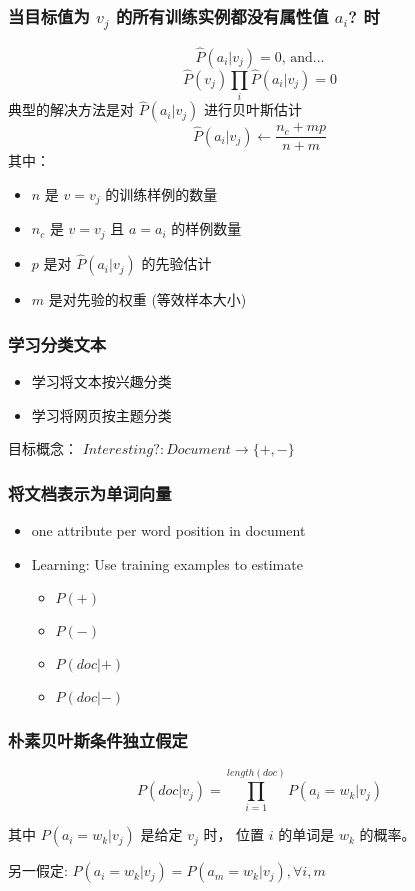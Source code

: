 \documentclass{beamer}
\begin{document}
\begin{frame}
\frametitle{当目标值为 $v_j$ 的所有训练实例都没有属性值 $a_i$? 时}
\label{sec-7-6}

    $$\hat{P}(a_i|v_j) = 0 \mbox{, and...}$$
    $$\hat{P}(v_{j}) \prod_{i} \hat{P}(a_{i} | v_{j}) = 0$$
    典型的解决方法是对 $\hat{P}(a_{i} | v_{j})$ 进行贝叶斯估计
       $$\hat{P}(a_{i} | v_{j}) \leftarrow \frac{n_{c} + mp}{n + m}$$
    其中：
\begin{itemize}
\item $n$ 是 $v=v_j$ 的训练样例的数量
\item $n_c$ 是 $v=v_j$ 且 $a=a_i$ 的样例数量
\item $p$ 是对 $\hat{P}(a_{i} | v_{j})$ 的先验估计
\item $m$ 是对先验的权重 (等效样本大小)
\end{itemize}
\end{frame}
\begin{frame}
\frametitle{学习分类文本}
\label{sec-7-7}

\begin{itemize}
\item 学习将文本按兴趣分类
\item 学习将网页按主题分类
\end{itemize}


目标概念： $Interesting? : Document \rightarrow \{+,-\}$
\end{frame}
\begin{frame}
\frametitle{将文档表示为单词向量}
\label{sec-7-8}

\begin{itemize}
\item one attribute per word position in document
\item Learning: Use training examples to estimate
\begin{itemize}
\item $P(+)$
\item $P(-)$
\item $P(doc|+)$
\item $P(doc|-)$
\end{itemize}
\end{itemize}
\end{frame}
\begin{frame}
\frametitle{朴素贝叶斯条件独立假定}
\label{sec-7-9}


$$P(doc|v_j) = \prod_{i=1}^{length(doc)} P(a_i=w_k | v_j)$$

其中 $P(a_i=w_k| v_j)$ 是给定 $v_j$ 时， 位置 $i$ 的单词是 $w_k$ 的概率。

另一假定: $P(a_i=w_k|v_j) = P(a_m=w_k|v_j), \forall i,m$
\end{frame}
\end{document}
